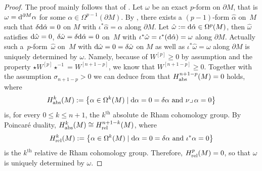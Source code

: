 \documentclass[pdftex]{sigma}
\numberwithin{equation}{section}
\begin{document}
\begin{proof}
The proof mainly follows that of \cite[Theorem 5]{RaulotSavo11}.
Let $\omega$ be an exact $p$-form on $\partial M$, that is $\omega={\rm d}^{\partial M}\alpha$ for some $\alpha\in\Omega^{p-1}(\partial M)$.
By \cite[Theorem 2]{DuffSpencer52}, there exists a $(p-1)$-form $\hat{\alpha}$ on~$M$ such that $\delta {\rm d}\hat{\alpha}=0$ on $M$ with $\iota^*\hat{\alpha}=\alpha$ along $\partial M$. Let $\hat{\omega}:={\rm d}\hat{\alpha}\in\Omega^p(M)$, then $\hat{\omega}$ satisfies ${\rm d}\hat{\omega}=0$, $\delta\hat{\omega}=\delta {\rm d}\hat{\alpha}=0$ on~$M$ with $\iota^*\hat{\omega}=\iota^*({\rm d}\hat{\alpha})=\omega$ along $\partial M$. Actually such a~$p$-form~$\hat{\omega}$ on~$M$ with ${\rm d}\hat{\omega}=0=\delta\hat{\omega}$ on $M$ as well as $\iota^*\hat{\omega}=\omega$ along $\partial M$ is uniquely determined by $\omega$. Namely, because of $W^{[p]}\geq0$ by assumption and the property $\star W^{[p]}\star^{-1}=W^{[n+1-p]}$, we know that $W^{[n+1-p]}\geq0$. Together with the assumption $\sigma_{n+1-p}>0$ we can deduce from \cite[Theorem~4]{RaulotSavo11} that $H_{\rm abs}^{n+1-p}(M)=0$  holds, where
\[H_{\rm abs}^{k}(M) :=\bigl\{\alpha\in\Omega^k(M) \mid {\rm d}\alpha=0=\delta\alpha\textrm{ and }\nu\lrcorner\,\alpha=0\bigr\}\]
is, for every $0\leq k\leq n+1$, the $k^{\textrm{th}}$ absolute de Rham cohomology group. By Poincar\'e duality, $H_{\rm abs}^{k}(M)\cong H_{\rm rel}^{n+1-k}(M)$,  where
\[H_{\rm rel}^{k}(M):=\bigl\{\alpha\in\Omega^k(M) \mid {\rm d}\alpha=0=\delta\alpha\textrm{ and }\iota^*\alpha=0\bigr\}\]
is the $k^{\textrm{th}}$ relative de Rham cohomology group. Therefore, $H_{\rm rel}^{p}(M)=0$, so that $\hat{\omega}$ is uniquely determined by $\omega$.


\end{proof}
\end{document}
